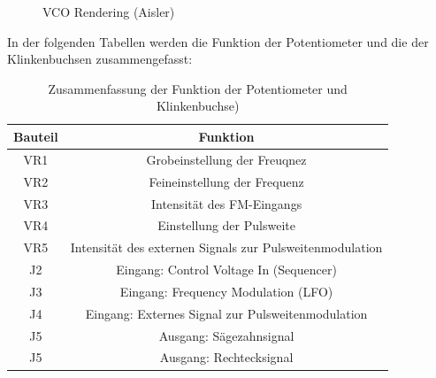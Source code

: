 \begin{figure}[h]
	\centering
	\setlength{\fboxsep}{1pt} %
	\setlength{\fboxrule}{1pt} %
	\caption{VCO Rendering (Aisler)}
	\label{fig:VCO Rendering}
\end{figure}

In der folgenden Tabellen werden die Funktion der Potentiometer und die der Klinkenbuchsen zusammengefasst:

\begin{table}[h]
	\centering
	\caption{Zusammenfassung der Funktion der Potentiometer und Klinkenbuchse)}
\begin{tabular}{|c|c|}
	\hline
	Bauteil & Funktion \\
	\hline
	VR1 & Grobeinstellung der Freuqnez \\
	\hline
	VR2 & Feineinstellung der Frequenz \\
	\hline
	VR3 & Intensität des FM-Eingangs \\
	\hline
	VR4 & Einstellung der Pulsweite\\
	\hline
	VR5 & Intensität des externen Signals zur Pulsweitenmodulation \\
	\hline
	J2 & Eingang: Control Voltage In (Sequencer) \\
	\hline
	J3 & Eingang: Frequency Modulation (LFO) \\
	\hline
	J4 &  Eingang: Externes Signal zur Pulsweitenmodulation\\
	\hline
	J5 &  Ausgang: Sägezahnsignal\\
	\hline
	J5 &  Ausgang: Rechtecksignal \\
	\hline
\end{tabular}
	\label{tab:VCO_Signale}
\end{table}



